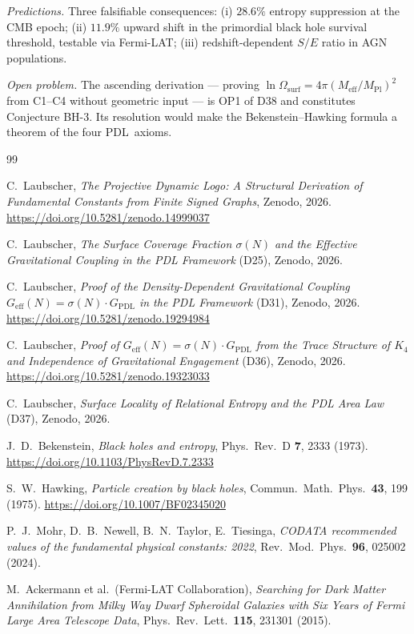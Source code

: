 \documentclass[11pt,a4paper]{article}
\theoremstyle{definition}
\newcommand{\PDL}{\textnormal{PDL}}
\newcommand{\Meff}{M_{\mathrm{eff}}}
\newcommand{\MPl}{M_{\mathrm{Pl}}}
\newcommand{\Omsurf}{\Omega_{\mathrm{surf}}}
\begin{document}
\emph{Predictions.} Three falsifiable consequences: (i) $28.6\%$ entropy
suppression at the CMB epoch; (ii) $11.9\%$ upward shift in the primordial
black hole survival threshold, testable via Fermi-LAT; (iii) redshift-dependent
$S/E$ ratio in AGN populations.

\emph{Open problem.} The ascending derivation --- proving
$\ln\Omsurf = 4\pi(\Meff/\MPl)^2$ from C1--C4 without geometric input ---
is OP1 of D38 and constitutes Conjecture BH-3. Its resolution would make
the Bekenstein--Hawking formula a theorem of the four \PDL\ axioms.

\begin{thebibliography}{99}

C.~Laubscher,
\textit{The Projective Dynamic Logo: A Structural Derivation of Fundamental Constants
from Finite Signed Graphs},
Zenodo, 2026. \url{https://doi.org/10.5281/zenodo.14999037}

C.~Laubscher,
\textit{The Surface Coverage Fraction $\sigma(N)$ and the Effective Gravitational
Coupling in the PDL Framework} (D25), Zenodo, 2026.

C.~Laubscher,
\textit{Proof of the Density-Dependent Gravitational Coupling
$G_{\mathrm{eff}}(N)=\sigma(N)\cdot G_{\mathrm{PDL}}$ in the PDL Framework} (D31),
Zenodo, 2026. \url{https://doi.org/10.5281/zenodo.19294984}

C.~Laubscher,
\textit{Proof of $G_{\mathrm{eff}}(N)=\sigma(N)\cdot G_{\mathrm{PDL}}$ from the
Trace Structure of $K_4$ and Independence of Gravitational Engagement} (D36),
Zenodo, 2026. \url{https://doi.org/10.5281/zenodo.19323033}

C.~Laubscher,
\textit{Surface Locality of Relational Entropy and the PDL Area Law} (D37),
Zenodo, 2026.

J.~D.~Bekenstein,
\textit{Black holes and entropy},
Phys.\ Rev.\ D \textbf{7}, 2333 (1973).
\url{https://doi.org/10.1103/PhysRevD.7.2333}

S.~W.~Hawking,
\textit{Particle creation by black holes},
Commun.\ Math.\ Phys.\ \textbf{43}, 199 (1975).
\url{https://doi.org/10.1007/BF02345020}

P.~J.~Mohr, D.~B.~Newell, B.~N.~Taylor, E.~Tiesinga,
\textit{CODATA recommended values of the fundamental physical constants: 2022},
Rev.\ Mod.\ Phys.\ \textbf{96}, 025002 (2024).

M.~Ackermann et al.\ (Fermi-LAT Collaboration),
\textit{Searching for Dark Matter Annihilation from Milky Way Dwarf Spheroidal
Galaxies with Six Years of Fermi Large Area Telescope Data},
Phys.\ Rev.\ Lett.\ \textbf{115}, 231301 (2015).

\end{thebibliography}
\end{document}
